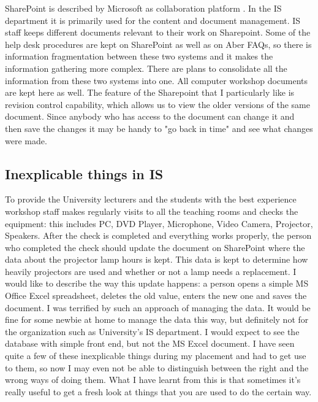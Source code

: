 \documentclass[10pt,a4paper,headinclude=true,twoside]{report}
\begin{document}
SharePoint is described by Microsoft as collaboration platform \cite{Sharepoint}. In the IS department it is primarily used  for the content and document management. IS staff keeps different documents relevant to their work on Sharepoint. Some of the help desk procedures are kept on SharePoint as well as on Aber FAQs, so there is information fragmentation between these two systems and it makes the information gathering more complex. There are plans to consolidate all the information from these two systems into one. All computer workshop documents are kept here as well. The feature of the Sharepoint that I particularly like is revision control capability, which allows us to view the older versions of the same document. Since anybody who has access to the document can change it and then save the changes it may be handy to "go back in time" and see what changes were made.

\subsection{Inexplicable things in IS}
\label{sec:stupid}
To provide the University lecturers and the students with the best experience workshop staff makes regularly visits to all the teaching rooms and checks the equipment: this includes PC, DVD Player, Microphone, Video Camera, Projector, Speakers. After the check is completed and everything works properly, the person who completed the check should update the document on SharePoint where the data about the projector lamp hours is kept. This data is kept to determine how heavily projectors are used and whether or not a lamp needs a replacement. I would like to describe the way this update happens: a person opens a simple MS Office Excel spreadsheet, deletes the old value, enters the new one and saves the document. I was terrified by such an approach of managing the data. It would be fine for some newbie at home to manage the data this way, but definitely not for the organization such as University's IS department. I would expect to see the database with simple front end, but not the MS Excel document. I have seen quite a few of these inexplicable things during my placement and had to get use to them, so now I may even not be able to distinguish between the right and the wrong ways of doing them. What I have learnt from this is that sometimes it's really useful to get a fresh look at things that you are used to do the certain way.      
\end{document}
